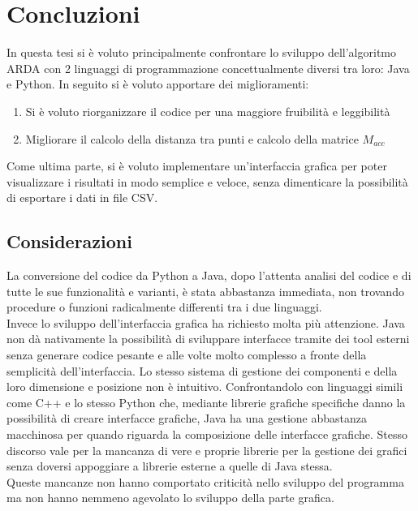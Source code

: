 \chapter{Concluzioni}
In questa tesi si \`e voluto principalmente confrontare lo sviluppo dell'algoritmo
ARDA con 2 linguaggi di programmazione concettualmente diversi tra loro: Java e Python.
In seguito si \`e voluto apportare dei miglioramenti:
\begin{enumerate}
    \item Si \`e voluto riorganizzare il codice per una maggiore fruibilit\`a e leggibilit\`a
    \item Migliorare il calcolo della distanza tra punti e calcolo della matrice $M_{acc}$
\end{enumerate}
Come ultima parte, si \`e voluto implementare un'interfaccia grafica per poter visualizzare
i risultati in modo semplice e veloce, senza dimenticare la possibilit\`a di esportare i
dati in file CSV.

\section{Considerazioni}
La conversione del codice da Python a Java, dopo l'attenta analisi del codice e di tutte
le sue funzionalit\`a e varianti, \`e stata abbastanza immediata, non trovando procedure o
funzioni radicalmente differenti tra i due linguaggi.\\
Invece lo sviluppo dell'interfaccia grafica ha richiesto molta pi\`u attenzione.
Java non d\`a nativamente la possibilit\`a di sviluppare interfacce tramite dei tool esterni
senza generare codice pesante e alle volte molto complesso a fronte della semplicit\`a dell'interfaccia.
Lo stesso sistema di gestione dei componenti e della loro dimensione e posizione non \`e
intuitivo. Confrontandolo con linguaggi simili come C++ e lo stesso Python che, mediante
librerie grafiche specifiche danno la possibilit\`a di creare interfacce grafiche, Java ha una
gestione abbastanza macchinosa per quando riguarda la composizione delle interfacce grafiche.
Stesso discorso vale per la mancanza di vere e proprie librerie per la gestione dei grafici
senza doversi appoggiare a librerie esterne a quelle di Java stessa.\\
Queste mancanze non hanno comportato criticit\`a nello sviluppo del programma ma non hanno
nemmeno agevolato lo sviluppo della parte grafica.

